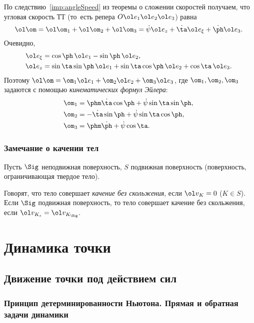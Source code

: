 \documentclass[a4paper,12pt]{article}
\def\w{\ol\om}
\def\v{\ol v}
\def\e{\ol e}
\def\d{\dot}
\begin{document}
По следствию~\ref{imp:angleSpeed} из теоремы о сложении скоростей получаем, что угловая
скорость ТТ (то~есть репера $O\e_1\e_2\e_3$) равна
$$\w=\w_1+\w_2+\w_3=\d\psi\e_z+\d\ta\e_\xi+\d\ph\e_3.$$
Очевидно,
$$\begin{aligned}\e_\xi&=\cos\ph\,\e_1-\sin\ph\,\e_2,\\
\e_z&=\sin\ta\sin\ph\,\e_1+\sin\ta\cos\ph\,\e_2+\cos\ta\,\e_3.
\end{aligned}$$
Поэтому $\w=\om_1\e_1+\om_2\e_2+\om_3\e_3$, где
$\om_1,\om_2,\om_3$ задаются с помощью \emph{кинематических формул
Эйлера}:
$$
\begin{aligned}
\om_1&=\phm\d\ta\cos\ph+\d\psi\sin\ta\sin\ph,\\
\om_2&=-\d\ta\sin\ph+\d\psi\sin\ta\cos\ph,\\
\om_3&=\phm\d\ph+\d\psi\cos\ta.
\end{aligned}
$$

\subsubsection{Замечание о качении тел}

Пусть $\Sig$ неподвижная поверхность, $S$ подвижная поверхность (поверхность,
ограничивающая твердое тело).

\begin{df}
Говорят, что тело совершает \emph{качение без скольжения},
если $\v_K=0$ ($K\in S$). Если $\Sig$ подвижная поверхность,
то тело совершает качение без скольжения, если $\v_{K_s}=\v_{K_\Sig}$.
\end{df}

\section{Динамика точки}

\subsection{Движение точки под действием сил}

\subsubsection{Принцип детерминированности Ньютона. Прямая и обратная задачи динамики}
\end{document}
